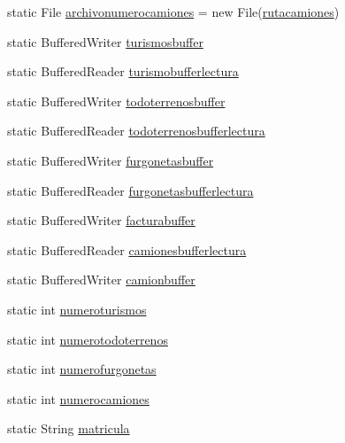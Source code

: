 \begin{DoxyCompactItemize}
\item 
static File \mbox{\hyperlink{classejercicio2_1_1_interfaz_aeeb42321ecdbd25ab4e98e6c2aee8022}{archivonumerocamiones}} = new File(\mbox{\hyperlink{classejercicio2_1_1_interfaz_a78395e467465db3af1017176104a3285}{rutacamiones}})
\item 
static Buffered\+Writer \mbox{\hyperlink{classejercicio2_1_1_interfaz_a8ec003ebd4da299a1b487aab95ea7b36}{turismosbuffer}}
\item 
static Buffered\+Reader \mbox{\hyperlink{classejercicio2_1_1_interfaz_a6d905d3f74b1598e7a0d2d44b3ac2c64}{turismobufferlectura}}
\item 
static Buffered\+Writer \mbox{\hyperlink{classejercicio2_1_1_interfaz_a10b41d1d157d473310e5ca19b345b430}{todoterrenosbuffer}}
\item 
static Buffered\+Reader \mbox{\hyperlink{classejercicio2_1_1_interfaz_a34107fe974b1953d290eb8d3f5440e90}{todoterrenosbufferlectura}}
\item 
static Buffered\+Writer \mbox{\hyperlink{classejercicio2_1_1_interfaz_afc1f23c9bed2a8e22ad0825ce995017d}{furgonetasbuffer}}
\item 
static Buffered\+Reader \mbox{\hyperlink{classejercicio2_1_1_interfaz_a071ace03fcd58df399ab0e64875ee980}{furgonetasbufferlectura}}
\item 
static Buffered\+Writer \mbox{\hyperlink{classejercicio2_1_1_interfaz_aaecb9f9f0c0f51b6da35cd9c5a580c84}{facturabuffer}}
\item 
static Buffered\+Reader \mbox{\hyperlink{classejercicio2_1_1_interfaz_a6fc692d8223f0706c7dedcf4695391a0}{camionesbufferlectura}}
\item 
static Buffered\+Writer \mbox{\hyperlink{classejercicio2_1_1_interfaz_afe1ebc5988283c18dc1e52c33f748402}{camionbuffer}}
\item 
static int \mbox{\hyperlink{classejercicio2_1_1_interfaz_a2c2164a11e5c14707bc95996584e3755}{numeroturismos}}
\item 
static int \mbox{\hyperlink{classejercicio2_1_1_interfaz_aa813efff3679bb9214161a3367ebb740}{numerotodoterrenos}}
\item 
static int \mbox{\hyperlink{classejercicio2_1_1_interfaz_aa5320294ddea983805052e0642b0b27f}{numerofurgonetas}}
\item 
static int \mbox{\hyperlink{classejercicio2_1_1_interfaz_a943a17a53c280c79469c0298b033ef21}{numerocamiones}}
\item 
static String \mbox{\hyperlink{classejercicio2_1_1_interfaz_a2065069b39a231840c917146d80179ea}{matricula}}

\end{DoxyCompactItemize}
